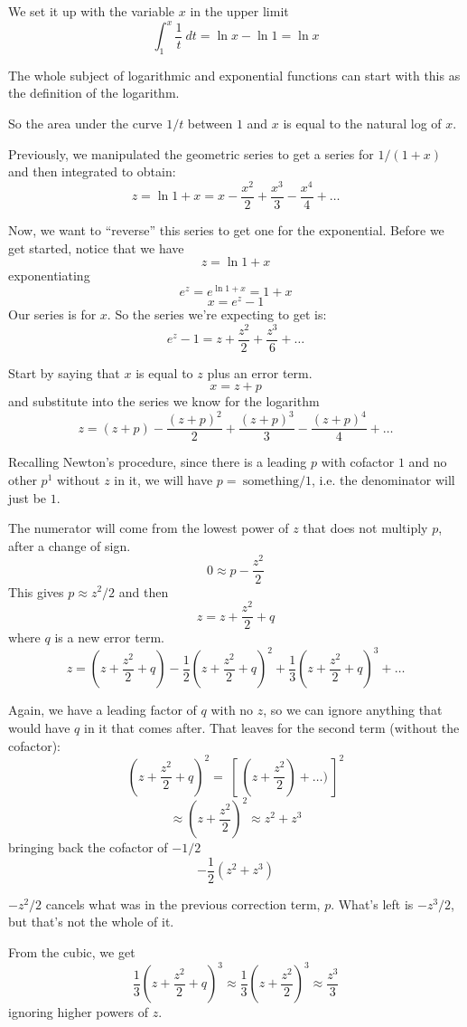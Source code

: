 \documentclass[11pt, oneside]{article}
\begin{document}
We set it up with the variable $x$ in the upper limit
\[ \int_1^x \frac{1}{t} \ dt = \ln x - \ln 1 = \ln x \]

The whole subject of logarithmic and exponential functions can start with this as the definition of the logarithm.

So the area under the curve $1/t$ between $1$ and $x$ is equal to the natural log of $x$.

Previously, we manipulated the geometric series to get a series for $1/(1 + x)$ and then integrated to obtain: 
\[ z = \ln 1 + x = x - \frac{x^2}{2} + \frac{x^3}{3} - \frac{x^4}{4} + \dots \]

Now, we want to ``reverse'' this series to get one for the exponential.  Before we get started, notice that we have
\[ z = \ln 1 + x \]
exponentiating
\[ e^z = e^{\ln 1 + x} = 1 + x \]
\[ x = e^z - 1 \]
Our series is for $x$.  So the series we're expecting to get is:
\[ e^z - 1 = z +  \frac{z^2}{2} + \frac{z^3}{6} + \dots \]

Start by saying that $x$ is equal to $z$ plus an error term.
\[ x = z + p \]
and substitute into the series we know for the logarithm
\[ z = (z + p) - \frac{(z + p)^2}{2} + \frac{(z + p)^3}{3} - \frac{(z + p)^4}{4} + \dots \]

Recalling Newton's procedure, since there is a leading $p$ with cofactor $1$ and no other $p^1$ without $z$ in it, we will have $p = \ \text{something}/1$, i.e. the denominator will just be $1$.  

The numerator will come from the lowest power of $z$ that does not multiply $p$, after a change of sign.
\[ 0 \approx p - \frac{z^2}{2} \]
This gives $p \approx z^2/2$ and then
\[ z = z +  \frac{z^2}{2} + q \]
where $q$ is a new error term.
\[ z = (z +  \frac{z^2}{2} + q) - \frac{1}{2} (z +  \frac{z^2}{2} + q)^2 + \frac{1}{3} (z +  \frac{z^2}{2} + q)^3 +  \dots \]

Again, we have a leading factor of $q$ with no $z$, so we can ignore anything that would have $q$ in it that comes after.  That leaves for the second term (without the cofactor):
\[  (z +  \frac{z^2}{2} + q)^2 =  \ [ \ (z + \frac{z^2}{2}) + \dots) \ ]^2 \]
\[ \approx (z + \frac{z^2}{2})^2 \approx z^2 + z^3 \]
bringing back the cofactor of $-1/2$ 
\[ -\frac{1}{2}( z^2 + z^3) \]

$-z^2/2$ cancels what was in the previous correction term, $p$.  What's left is $-z^3/2$, but that's not the whole of it.

From the cubic, we get 
\[ \frac{1}{3} (z +  \frac{z^2}{2} + q)^3 \approx \frac{1}{3}(z + \frac{z^2}{2})^3 \approx \frac{z^3}{3} \]
ignoring higher powers of $z$.
\end{document}
